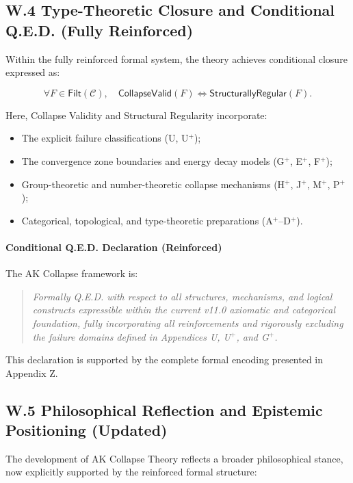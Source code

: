 \documentclass[11pt]{article}
\begin{document}
\subsection*{W.4 Type-Theoretic Closure and Conditional Q.E.D. (Fully Reinforced)}

Within the fully reinforced formal system, the theory achieves conditional closure expressed as:

\[
\forall F \in \mathsf{Filt}(\mathcal{C}), \quad \mathsf{CollapseValid}(F) \iff \mathsf{StructurallyRegular}(F).
\]

Here, Collapse Validity and Structural Regularity incorporate:

\begin{itemize}
    \item The explicit failure classifications (U, U$^{+}$);
    \item The convergence zone boundaries and energy decay models (G$^{+}$, E$^{+}$, F$^{+}$);
    \item Group-theoretic and number-theoretic collapse mechanisms (H$^{+}$, J$^{+}$, M$^{+}$, P$^{+}$);
    \item Categorical, topological, and type-theoretic preparations (A$^{+}$–D$^{+}$).
\end{itemize}

\paragraph{Conditional Q.E.D. Declaration (Reinforced)}  
The AK Collapse framework is:

\begin{quote}
\textit{Formally Q.E.D. with respect to all structures, mechanisms, and logical constructs expressible within the current v11.0 axiomatic and categorical foundation, fully incorporating all reinforcements and rigorously excluding the failure domains defined in Appendices U, U$^{+}$, and G$^{+}$.}
\end{quote}

This declaration is supported by the complete formal encoding presented in Appendix Z.

\subsection*{W.5 Philosophical Reflection and Epistemic Positioning (Updated)}

The development of AK Collapse Theory reflects a broader philosophical stance, now explicitly supported by the reinforced formal structure:
\end{document}
